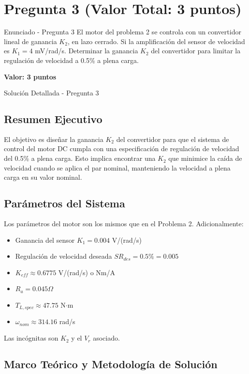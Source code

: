 \documentclass[12pt]{article}
\begin{document}
\newpage
\section{Pregunta 3 (Valor Total: 3 puntos)}
\begin{problemstatementbox}{Enunciado - Pregunta 3}
El motor del problema 2 se controla con un convertidor lineal de ganancia $K_2$, en lazo cerrado. Si la amplificación del sensor de velocidad es $K_1 = 4$ mV/rad/s. Determinar la ganancia $K_2$ del convertidor para limitar la regulación de velocidad a 0.5\% a plena carga.
\begin{center}
    \colorbox{gray!20}{\textbf{Valor: 3 puntos}}
\end{center}
\end{problemstatementbox}

\begin{solutionbox}{Solución Detallada - Pregunta 3}

\subsection*{Resumen Ejecutivo}
El objetivo es diseñar la ganancia $K_2$ del convertidor para que el sistema de control del motor DC cumpla con una especificación de regulación de velocidad del 0.5\% a plena carga. Esto implica encontrar una $K_2$ que minimice la caída de velocidad cuando se aplica el par nominal, manteniendo la velocidad a plena carga en su valor nominal.

\subsection*{Parámetros del Sistema}
Los parámetros del motor son los mismos que en el Problema 2. Adicionalmente:
\begin{itemize}
    \item Ganancia del sensor $K_1 = 0.004$ V/(rad/s)
    \item Regulación de velocidad deseada $SR_{des} = 0.5\% = 0.005$
    \item $K_{eff} \approx 0.6775$ V/(rad/s) o Nm/A
    \item $R_a = 0.045 \Omega$
    \item $T_{L,spec} \approx 47.75$ N$\cdot$m
    \item $\omega_{nom} \approx 314.16$ rad/s
\end{itemize}
Las incógnitas son $K_2$ y el $V_r$ asociado.

\subsection*{Marco Teórico y Metodología de Solución}


\end{solutionbox}
\end{document}
